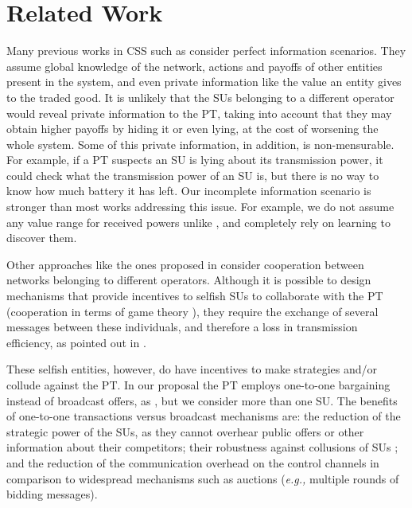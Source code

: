 \section{Related Work}\label{sec:Rel}
Many previous works in CSS such as \cite{ref:Simeone2008,ref:Zhang2009,ref:Yi2010,ref:Nadkar2011} consider perfect information scenarios. 
They assume global knowledge of the network, actions and payoffs of other entities present in the system, and even private information like the value an entity gives to the traded good.
It is unlikely that the SUs belonging to a different operator would reveal private information to the PT, taking into account that they may obtain higher payoffs by hiding it or even lying, at the cost of worsening the whole system. 
Some of this private information, in addition, is non-mensurable. For example, if a PT suspects an SU is lying about its transmission power, it could check what the transmission power of an SU is, but there is no way to know how much battery it has left. 
Our incomplete information scenario is stronger than most works addressing this issue. 
For example, we do not assume any value range for received powers unlike \cite{ref:Feng2014}, and completely rely on learning to discover them. 

Other approaches like the ones proposed in \cite{ref:Yuan2013,ref:Han2010,ref:Li2011} consider cooperation between networks belonging to different operators. 
Although it is possible to design mechanisms that provide incentives to selfish SUs to collaborate with the PT (cooperation in terms of game theory \cite{ref:Zhang2012_Fair}), they require the exchange of several messages between these individuals, and therefore a loss in transmission efficiency, as pointed out in \cite{ref:Niyato2008}.

These selfish entities, however, do have incentives to make strategies and/or collude against the PT. 
In our proposal the PT employs one-to-one bargaining instead of broadcast offers, as \cite{ref:Yan2013}, but we consider more than one SU. The benefits of one-to-one transactions versus broadcast mechanisms \cite{ref:Feng2014,ref:Duan2014,ref:Jayaweera2011,ref:Zhang2009,ref:Simeone2008} are: the reduction of the strategic power of the SUs, as they cannot overhear public offers or other information about their competitors; their robustness against collusions of SUs \cite{ref:Alcaraz2014_coa}; and the reduction of the communication overhead on the control channels in comparison to widespread mechanisms such as auctions \cite{ref:Feng2014, ref:Jayaweera2011} (\textit{e.g.,} multiple rounds of bidding messages).

